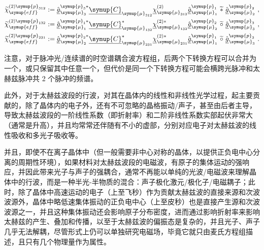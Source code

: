 \begin{subequations} \label{eq:2-215}
	\abovedisplayskip=13pt
	\belowdisplayskip=13pt
	\begin{align}
		\widetilde{\chi}^{(2)\symup{p}_{312}}_{\symup{eff}} &:= \hat{\underline{g}}^{\symup{p}_{3}*}_{{\symup{\mu}}_{3}} \underline{\symup{C}}^{}_{{\symup{\mu}}_{312}} \underline{\chi}^{(2)}_{{\symup{\mu}}_{312}} \hat{\underline{g}}^{\symup{p}_{1}}_{{\symup{\mu}}_1} \ \widetilde *\ \hat{\underline{g}}^{\symup{p}_{2}}_{{\symup{\mu}}_2} \label{eq:2-215a}~, \\ \widetilde{\chi}^{(2)\symup{p}_{132}}_{\symup{eff}} &:= \hat{\underline{g}}^{\symup{p}_{1}*}_{{\symup{\mu}}_{1}} \underline{\symup{C}}^{*}_{{\symup{\mu}}_{132}} \underline{\chi}^{(2)*}_{{\symup{\mu}}_{132}} \hat{\underline{g}}^{\symup{p}_{2}}_{{\symup{\mu}}_2} \ \widetilde \circ\ \hat{\underline{g}}^{\symup{p}_{3}}_{{\symup{\mu}}_3} \label{eq:2-215b}~, \\ \widetilde{\chi}^{(2)\symup{p}_{231}}_{\symup{eff}} &:= \hat{\underline{g}}^{\symup{p}_{2}*}_{{\symup{\mu}}_{2}} \underline{\symup{C}}^{*}_{{\symup{\mu}}_{231}} \underline{\chi}^{(2)*}_{{\symup{\mu}}_{231}} \hat{\underline{g}}^{\symup{p}_{1}}_{{\symup{\mu}}_1} \ \widetilde \circ\ \hat{\underline{g}}^{\symup{p}_{3}}_{{\symup{\mu}}_3} \label{eq:2-215c}~.
	\end{align}
\end{subequations}

注意，对于脉冲光/连续谱的时空谱耦合波方程组，后两个下转换方程可以合并为一个，或只保留其中任意一个，但代价是同一个下转换方程可能会横跨光脉冲和太赫兹脉冲共 2 个脉冲的频谱。

此外，对于太赫兹波段的行波，对其在晶体内的线性和非线性光学过程，起主要贡献的，除了晶体内的电子外，还有不可忽略的晶格振动/声子，甚至由后者主导，导致太赫兹波段的一阶线性系数（即折射率）和二阶非线性系数实部起伏非常大（通常是升高），并且均常常还伴随有不小的虚部，分别对应电子对太赫兹波的线性吸收和多光子吸收等。

并且，即使不在离子晶体中（但一般需要非中心对称的晶体，以提供正负电中心分离的周期性环境），如果材料对太赫兹波段的电磁波，有原子的集体运动的强响应，并因此带来光子与声子的强耦合，通常不再能以单纯的光波/电磁波来理解晶体中的行波，而是一种半光-半物质的混合：声子极化激元/极化子/电磁耦子；此时，除了晶体中高速运动的电子（上至飞秒）作为贡献太赫兹波的直接来源和次波波源外，晶体中略低速集体振动的正负电中心（上至皮秒）也是直接产生源和次波波源之一，并且这种集体振动还会影响原子分布密度，进而通过影响折射率来影响太赫兹的产生、叠加和传播，以至于太赫兹波的偏振态是复杂的，并且光子、声子几乎无法解耦，尽管形式上仍可以单独研究电磁场，毕竟它就只由麦氏方程组描述，且只有几个物理量作为属性。

